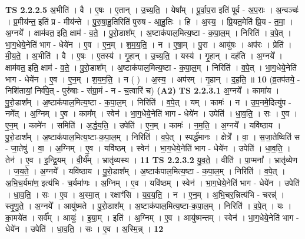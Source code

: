 \documentclass[17pt]{extarticle}
\begin{document}
                  \newline
                                \textbf{ TS 2.2.2.5} \newline
                  अ॒भीति॑ । वै । ए॒षः । ए॒तान् । उ॒च्य॒ति॒ । येषा᳚म् । पू॒र्वा॒प॒रा इति॑ पूर्व - अ॒प॒राः । अ॒न्वञ्चः॑ । प्र॒मीय॑न्त॒ इति॑ प्र - मीय॑न्ते । पु॒रु॒षा॒हु॒तिरिति॑ पुरुष - आ॒हु॒तिः । हि । अ॒स्य॒ । प्रि॒यत॒मेति॑ प्रि॒य - त॒मा॒ । अ॒ग्नये᳚ । क्षाम॑वत॒ इति॒ क्षाम॑ - व॒ते॒ । पु॒रो॒डाश᳚म् । अ॒ष्टाक॑पाल॒मित्य॒ष्टा - क॒पा॒ल॒म् । निरिति॑ । व॒पे॒त् । भा॒ग॒धेये॒नेति॑ भाग - धेये॑न । ए॒व । ए॒न॒म् । श॒म॒य॒ति॒ । न । ए॒षा॒म् । पु॒रा । आयु॑षः । अप॑रः । प्रेति॑ । मी॒य॒ते॒ । अ॒भीति॑ । वै । ए॒षः । ए॒तस्य॑ । गृ॒हान् । उ॒च्य॒ति॒ । यस्य॑ । गृ॒हान् । दह॑ति । अ॒ग्नये᳚ । क्षाम॑वत॒ इति॒ क्षाम॑ - व॒ते॒ । पु॒रो॒डाश᳚म् । अ॒ष्टाक॑पाल॒मित्य॒ष्टा - क॒पा॒ल॒म् । निरिति॑ । व॒पे॒त् । भा॒ग॒धेये॒नेति॑ भाग - धेये॑न । ए॒व । ए॒न॒म् । श॒य॒म॒ति॒ । न ( ) । अ॒स्य॒ । अप॑रम् । गृ॒हान् । द॒ह॒ति॒ ॥ \textbf{  10 } \newline
                  \newline
                      (व्र॒तप॑तये॒ - निशि॑तायां॒ निर्व॑पे॒त् - पुरु॑षाः - संग्रा॒मं - न - च॒त्वारि॑ च)  \textbf{(A2)} \newline \newline
                                \textbf{ TS 2.2.3.1} \newline
                  अ॒ग्नये᳚ । कामा॑य । पु॒रो॒डाश᳚म् । अ॒ष्टाक॑पाल॒मित्य॒ष्टा - क॒पा॒ल॒म् । निरिति॑ । व॒पे॒त् । यम् । कामः॑ । न । उ॒प॒नमे॒दित्यु॑प - नमे᳚त् । अ॒ग्निम् । ए॒व । काम᳚म् । स्वेन॑ । भा॒ग॒धेये॒नेति॑ भाग - धेये॑न । उपेति॑ । धा॒व॒ति॒ । सः । ए॒व । ए॒न॒म् । कामे॑न । समिति॑ । अ॒र्द्ध॒य॒ति॒ । उपेति॑ । ए॒न॒म् । कामः॑ । न॒म॒ति॒ । अ॒ग्नये᳚ । यवि॑ष्ठाय । पु॒रो॒डाश᳚म् । अ॒ष्टाक॑पाल॒मित्य॒ष्टा-क॒पा॒ल॒म् । निरिति॑ । व॒पे॒त् । स्पर्द्ध॑मानः । क्षेत्रे᳚ । वा॒ । स॒जा॒तेष्विति॑ स - जा॒तेषु॑ । वा॒ । अ॒ग्निम् । ए॒व । यवि॑ष्ठम् । स्वेन॑ । भा॒ग॒धेये॒नेति॑ भाग - धेये॑न । उपेति॑ । धा॒व॒ति॒ । तेन॑ । ए॒व । इ॒न्द्रि॒यम् । वी॒र्य᳚म् । भ्रातृ॑व्यस्य । \textbf{  11} \newline
                  \newline
                                \textbf{ TS 2.2.3.2} \newline
                  यु॒व॒ते॒ । वीति॑ । पा॒प्मना᳚ । भ्रातृ॑व्येण । ज॒य॒ते॒ । अ॒ग्नये᳚ । यवि॑ष्ठाय । पु॒रो॒डाश᳚म् । अ॒ष्टाक॑पाल॒मित्य॒ष्टा - क॒पा॒ल॒म् । निरिति॑ । व॒पे॒त् । अ॒भि॒च॒र्यमा॑ण॒ इत्य॑भि - च॒र्यमा॑णः । अ॒ग्निम् । ए॒व । यवि॑ष्ठम् । स्वेन॑ । भा॒ग॒धेये॒नेति॑ भाग - धेये॑न । उपेति॑ । धा॒व॒ति॒ । सः । ए॒व । अ॒स्मा॒त् । रक्षाꣳ॑सि । य॒व॒य॒ति॒ । न । ए॒न॒म् । अ॒भि॒चर॒न्नित्य॑भि - चरन्न्॑ । स्तृ॒णु॒ते॒ । अ॒ग्नये᳚ । आयु॑ष्मते । पु॒रो॒डाश᳚म् । अ॒ष्टाक॑पाल॒मित्य॒ष्टा-क॒पा॒ल॒म् । निरिति॑ । व॒पे॒त् । यः । का॒मये॑त । सर्व᳚म् । आयुः॑ । इ॒या॒म् । इति॑ । अ॒ग्निम् । ए॒व । आयु॑ष्मन्तम् । स्वेन॑ । भा॒ग॒धेये॒नेति॑ भाग - धेये॑न । उपेति॑ । धा॒व॒ति॒ । सः । ए॒व । अ॒स्मि॒न्न् । \textbf{  12} \newline
\end{document}

